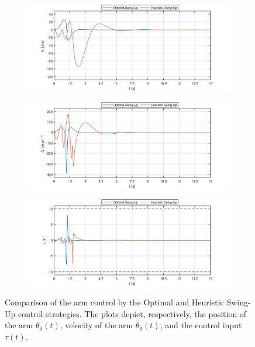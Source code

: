\begin{figure}[H]
	\centering
	\begin{subfigure}
		\centering
		\includegraphics[scale=0.6]{images/Dswing/arm.pdf}  
	\end{subfigure}
	\begin{subfigure}
		\centering
		\includegraphics[scale=0.6]{images/Dswing/darm.pdf}  
	\end{subfigure}
	\begin{subfigure}
		\centering
		\includegraphics[scale=0.6]{images/Dswing/control.pdf}  
	\end{subfigure}
	\caption{Comparison of the arm control by the Optimal and Heuristic Swing-Up control strategies. The plots depict, respectively, the position of the arm $\theta_0(t)$, velocity of the arm $\dot{\theta}_0(t)$, and the control input $\tau(t)$.}
	\label{results}
\end{figure}
